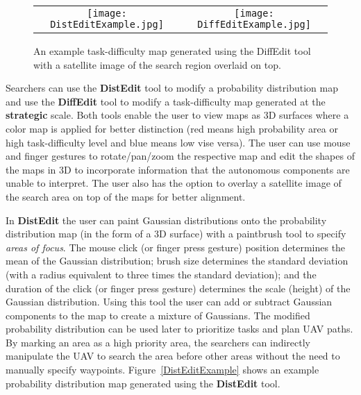 \begin{figure}
\centering
\begin{tabular}{cc}
	\begin{minipage}{0.45\textwidth}
	\centering
	\texttt{[image: DistEditExample.jpg]}
	\caption{An example probability distribution map generated using the DistEdit tool.}
	\label{DistEditExample}
	\end{minipage}
&
	\begin{minipage}{0.45\textwidth}
	\centering
	\texttt{[image: DiffEditExample.jpg]}
	\caption{An example task-difficulty map generated using the DiffEdit tool with a satellite image of the search region overlaid on top.}
	\label{DiffEditExample}
	\end{minipage}
\end{tabular}
\end{figure}

Searchers can use the \textbf{DistEdit} tool to modify a probability distribution map and use the \textbf{DiffEdit} tool to modify a task-difficulty map generated at the \textbf{strategic} scale. Both tools enable the user to view maps as 3D surfaces where a color map is applied for better distinction (red means high probability area or high task-difficulty level and blue means low vise versa). The user can use mouse and finger gestures to rotate/pan/zoom the respective map and edit the shapes of the maps in 3D to incorporate information that the autonomous components are unable to interpret. The user also has the option to overlay a satellite image of the search area on top of the maps for better alignment.

In \textbf{DistEdit} the user can paint Gaussian distributions onto the probability distribution map (in the form of a 3D surface) with a paintbrush tool to specify \textit{areas of focus}. The mouse click (or finger press gesture) position determines the mean of the Gaussian distribution; brush size determines the standard deviation (with a radius equivalent to three times the standard deviation); and the duration of the click (or finger press gesture) determines the scale (height) of the Gaussian distribution. Using this tool the user can add or subtract Gaussian components to the map to create a mixture of Gaussians. The modified probability distribution can be used later to prioritize tasks and plan UAV paths. By marking an area as a high priority area, the searchers can indirectly manipulate the UAV to search the area before other areas without the need to manually specify waypoints. Figure~\ref{DistEditExample} shows an example probability distribution map generated using the \textbf{DistEdit} tool.

